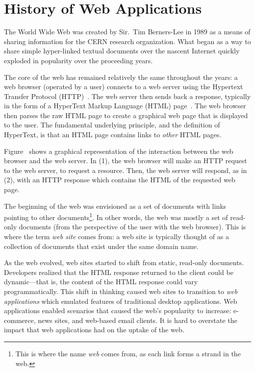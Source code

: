 \section{History of Web Applications}

The World Wide Web was created by Sir.\ Tim Berners-Lee in 1989 as a
means of sharing information for the CERN research organization. What
began as a way to share simple hyper-linked textual documents over
the nascent Internet quickly exploded in popularity over the
proceeding years.

The core of the web has remained relatively the same throughout the
years: a web browser (operated by a user) connects to a web server
using the Hypertext Transfer Protocol (HTTP)~\cite{fielding99:http11}.
The web server then sends back a response, typically in the form of a
HyperText Markup Language (HTML) page~\cite{berjon14:html5}. The web
browser then parses the raw HTML page to create a graphical web page that
is displayed to the user. The fundamental underlying principle, and
the definition of HyperText, is that an HTML page contains links to
\emph{other} HTML pages.



Figure~ shows a graphical
representation of the interaction between the web browser and the web
server. In (1), the web browser will make an HTTP request to the web
server, to request a resource. Then, the web server will respond, as
in (2), with an HTTP response which contains the HTML of the requested
web page.

The beginning of the web was envisioned as a set of documents with
links pointing to other documents\footnote{This is where the name
  \emph{web} comes from, as each link forms a strand in the web.}. In
other words, the web was mostly a set of read-only documents (from the
perspective of the user with the web browser). This is where the term
\emph{web site} comes from: a web site is typically thought of as a
collection of documents that exist under the same domain name.

As the web evolved, web sites started to shift from static, read-only
documents. Developers realized that the HTML response returned to the
client could be dynamic---that is, the content of the HTML response
could vary programmatically. This shift in thinking caused web sites to
transition to \emph{web applications} which emulated features of
traditional desktop applications. Web applications enabled scenarios
that caused the web's popularity to increase: e-commerce, news sites, and
web-based email clients. It is hard to overstate the impact that web
applications had on the uptake of the web. 

